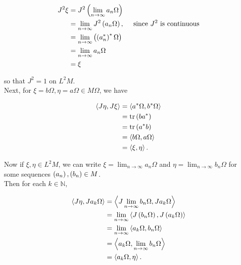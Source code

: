 \documentclass[a4paper,10pt]{report}
\begin{document}
\begin{enumerate}
\begin{enumerate}
                  \begin{align*}
                    J^2 \xi%
                    &= J^2 \E \lim_{n \to \infty} a_n \Omega \R\\
                    &= \lim_{n \to \infty} J^2 \E a_n \Omega \R, \quad \te{ since $J^2$ is continuous}\\
                    &= \lim_{n \to \infty} \E \E a_n^* \R^* \Omega \R\\
                    &= \lim_{n \to \infty} a_n \Omega\\
                    &= \xi
                  \end{align*}

                  so that $J^2 = 1$ on $L^2 M$.\\
                  Next, for $\xi = b \Omega , \eta = a \Omega \in M \Omega$, we have

                  \begin{align*}
                    \ET J \eta , J \xi \TE%
                    &= \ET a^* \Omega , b^* \Omega\TE\\
                    &= \tr \E b a^* \R\\
                    &= \tr \E a^* b \R\\
                    &= \ET b \Omega , a \Omega \TE\\
                    &= \ET \xi , \eta \TE.
                  \end{align*}

                  Now if $\xi , \eta \in L^2 M$, we can write $\xi = \lim_{n \to \infty} a_n \Omega$ and $\eta = \lim_{n \to \infty} b_n \Omega$ for some sequences $\left( a_n \right) , \left( b_n \right) \in M$.\\
                  Then for each $k \in \mathbb N$,

                  \begin{align*}
                    \ET J \eta , J a_k \Omega \TE%
                    &= \ET J \lim_{n \to \infty} b_n \Omega , J a_k \Omega \TE\\
                    &= \lim_{n \to \infty} \ET J \E b_n \Omega \R , J \E a_k \Omega \R \TE\\
                    &= \lim_{n \to \infty} \ET a_k \Omega , b_n \Omega \TE\\
                    &= \ET a_k \Omega , \lim_{n \to \infty} b_n \Omega \TE\\
                    &= \ET a_k \Omega , \eta \TE.
                  \end{align*}


\end{enumerate}
\end{enumerate}
\end{document}
